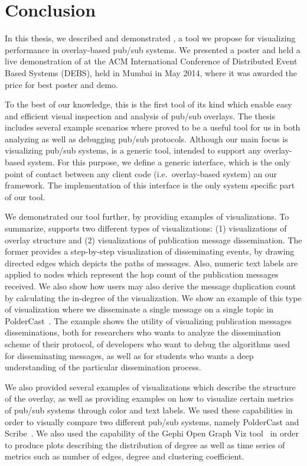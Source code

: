 \section{Conclusion}

In this thesis, we described and demonstrated \demo{}, a tool we propose
for visualizing performance in overlay-based pub/sub systems. We
presented a poster and held a live demonstration of \demo{} at the ACM
International Conference of Distributed Event Based Systems (DEBS), held
in Mumbai in May 2014, where it was awarded the price for best poster
and demo.

To the best of our knowledge, this is the first tool of its kind which
enable easy and efficient visual inspection and analysis of pub/sub
overlays. The thesis includes several example scenarios where \demo{}
proved to be a useful tool for us in both analyzing as well as debugging
pub/sub protocols. Although our main focus is visualizing pub/sub
systems, \demo{} is a generic tool, intended to support any overlay-
based system. For this purpose, we define a generic interface, which is
the only point of contact between any client code (i.e.\ overlay-based system)
an our framework. The implementation of this interface is the only
system specific part of our tool.

We demonstrated our tool further, by providing examples of
visualizations. To summarize, \demo{} supports two different types of
visualizations: (1) visualizations of overlay structure and (2)
visualizations of publication message dissemination. The former provides
a step-by-step visualization of disseminating events, by drawing
directed edges which depicts the paths of messages. Also, numeric text
labels are applied to nodes which represent the hop count of the
publication messages received. We also show how users may also derive
the message duplication count by calculating the in-degree of the
visualization. We show an example of this type of visualization where we
disseminate a single message on a single topic in
PolderCast~\cite{Setty:2012}. The example shows the utility of
visualizing publication messages disseminations, both for researchers
who wants to analyze the dissemination scheme of their protocol, of
developers who want to debug the algorithms used for disseminating
messages, as well as for students who wants a deep understanding of the
particular dissemination process.

We also provided several examples of visualizations which describe the
structure of the overlay, as well as providing examples on how to
visualize certain metrics of pub/sub systems through color and text
labels. We used these capabilities in order to
visually compare two different pub/sub systems, namely PolderCast and
Scribe~\cite{Castro:2002}. We also used the capability of the Gephi Open
Graph Viz tool~\cite{ICWSM09154} in order to produce plots describing
the distribution of degree as well as time series of metrics such as
number of edges, degree and clustering coefficient.

